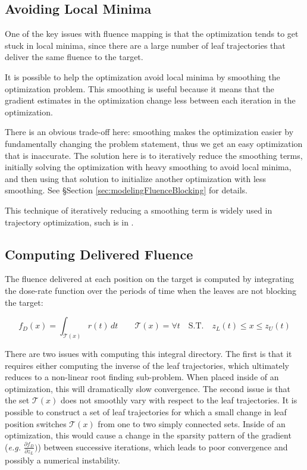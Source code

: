 \subsection{Avoiding Local Minima}

One of the key issues with fluence mapping is that the
optimization tends to get stuck in local minima,
since there are a large number of leaf trajectories that deliver the same fluence to the target.

It is possible to help the optimization avoid local minima by smoothing the optimization problem.
This smoothing is useful because it means that the gradient estimates in the optimization change less
between each iteration in the optimization.

There is an obvious trade-off here: smoothing makes the optimization easier by fundamentally changing the problem statement,
thus we get an easy optimization that is inaccurate.
The solution here is to iteratively reduce the smoothing terms,
initially solving the optimization with heavy smoothing to avoid local minima,
and then using that solution to initialize another optimization with less smoothing.
See \S Section \ref{sec:modelingFluenceBlocking} for details.

This technique of iteratively reducing a smoothing term is widely used in trajectory optimization,
such is in \cite{Srinivasan2006}.


\subsection{Computing Delivered Fluence}

The fluence delivered at each position on the target is computed by integrating the
dose-rate function over the periods of time when the leaves are not blocking the target:

\begin{equation}
  f_D(x) = \int_{\mathcal{T}(x)} \! r(t) \,dt
  \quad \quad
  \mathcal{T}(x) = \forall t
  \quad
  \text{S.T.}
  \quad
  z_L(t) \leq x \leq z_U(t)
  \label{eqn:fluenceMapIntegral}
\end{equation}

There are two issues with computing this integral directory.
The first is that it requires either computing the inverse of the leaf trajectories,
which ultimately reduces to a non-linear root finding sub-problem.
When placed inside of an optimization, this will dramatically slow convergence.
The second issue is that the set $\mathcal{T}(x)$ does not smoothly vary with respect to the leaf trajectories.
It is possible to construct a set of leaf trajectories for which a small change in leaf position
switches $\mathcal{T}(x)$ from one to two simply connected sets.
Inside of an optimization, this would cause a change in the sparsity pattern of the gradient
(\textit{e.g.} $\tfrac{\partial f_D}{\partial z_L})$)
between successive iterations,
which leads to poor convergence and possibly a numerical instability.

